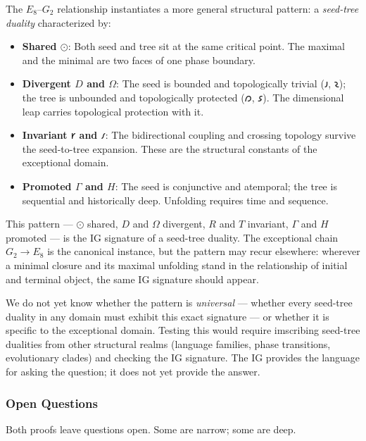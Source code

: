 \documentclass[12pt,a4paper]{article}
\begin{document}
The $E_8$--$G_2$ relationship instantiates a more general structural pattern: a \emph{seed-tree duality} characterized by:

\begin{itemize}
    \item \textbf{Shared $⊙$}: Both seed and tree sit at the same critical point. The maximal and the minimal are two faces of one phase boundary.
    \item \textbf{Divergent $D$ and $\Omega$}: The seed is bounded and topologically trivial ($𐑨$, $𐑷$); the tree is unbounded and topologically protected ($𐑼$, $𐑭$). The dimensional leap carries topological protection with it.
    \item \textbf{Invariant $𐑾$ and $𐑥$}: The bidirectional coupling and crossing topology survive the seed-to-tree expansion. These are the structural constants of the exceptional domain.
    \item \textbf{Promoted $\Gamma$ and $H$}: The seed is conjunctive and atemporal; the tree is sequential and historically deep. Unfolding requires time and sequence.
\end{itemize}

This pattern --- $⊙$ shared, $D$ and $\Omega$ divergent, $R$ and $T$ invariant, $\Gamma$ and $H$ promoted --- is the IG signature of a seed-tree duality. The exceptional chain $G_2 \to E_8$ is the canonical instance, but the pattern may recur elsewhere: wherever a minimal closure and its maximal unfolding stand in the relationship of initial and terminal object, the same IG signature should appear.

We do not yet know whether the pattern is \emph{universal} --- whether every seed-tree duality in any domain must exhibit this exact signature --- or whether it is specific to the exceptional domain. Testing this would require imscribing seed-tree dualities from other structural realms (language families, phase transitions, evolutionary clades) and checking the IG signature. The IG provides the language for asking the question; it does not yet provide the answer.

\subsubsection{Open Questions}

Both proofs leave questions open. Some are narrow; some are deep.
\end{document}

